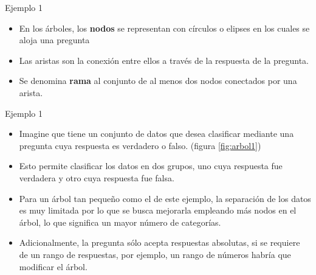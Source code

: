 \documentclass[11pt,aspectratio=169]{beamer}
\begin{document}
\begin{frame}{Ejemplo 1}
	\begin{itemize}
		\item En los árboles, los \textbf{nodos} se representan con círculos o elipses 
		en los cuales se aloja una pregunta \pause 
		\item Las aristas son la conexión entre ellos a través de la respuesta de la 
		pregunta. 
		\item Se denomina \textbf{rama} al conjunto de al menos dos nodos conectados 
		por una arista.
	\end{itemize}
\end{frame}

\begin{frame}{Ejemplo 1}
	\begin{itemize}
		\item Imagine que tiene un conjunto de datos que desea clasificar mediante 
		una pregunta cuya respuesta es verdadero o falso. (figura \ref{fig:arbol1}) \pause
		\item Esto permite clasificar los datos en dos grupos, uno cuya respuesta 
		fue verdadera y otro cuya respuesta fue falsa. \pause
		\item Para un árbol tan pequeño como el de este ejemplo, la separación de 
		los datos es muy limitada por lo que se busca mejorarla empleando más nodos 
		en el árbol, lo que significa un mayor número de categorías.\pause
		\item Adicionalmente, la pregunta sólo acepta respuestas absolutas, si se 
		requiere de un rango de respuestas, por ejemplo, un rango de números 
		habría que modificar el árbol.
	\end{itemize}
\end{frame}
\end{document}
